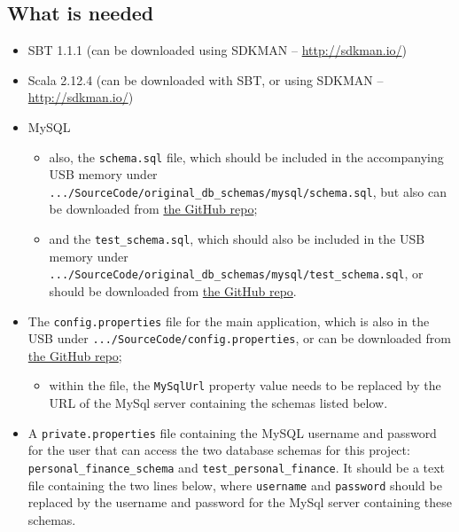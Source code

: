\subsection{What is needed}
\begin{itemize}
  \item
    SBT 1.1.1 (can be downloaded using SDKMAN -- \href{http://sdkman.io/}{http://sdkman.io/})

  \item
    Scala 2.12.4 (can be downloaded with SBT, or using SDKMAN -- 
    \href{http://sdkman.io/}{http://sdkman.io/})

  \item
    MySQL
    \begin{itemize}
      \item
        also, the \texttt{schema.sql} file, which should be included in the
        accompanying USB memory under
        \texttt{.../SourceCode/original\_db\_schemas/mysql/schema.sql}, but
        also can be downloaded from
        \href{https://github.com/claudiusbr/personal_finance_system/tree/master/code/original_db_schemas/mysql}{the
        GitHub repo};

      \item
        and the \texttt{test\_schema.sql}, which should also be included in the
        USB memory under
        \texttt{.../SourceCode/original\_db\_schemas/mysql/test\_schema.sql},
        or should be downloaded from
        \href{https://github.com/claudiusbr/personal_finance_system/tree/master/code/original_db_schemas/mysql}{the
        GitHub repo}.
    \end{itemize}

  \item
    The \texttt{config.properties} file for the main application, which is also
    in the USB under
    \texttt{.../SourceCode/config.properties}, or
    can be downloaded from
    \href{https://github.com/claudiusbr/personal_finance_system/tree/master/code}{the
    GitHub repo};
    \begin{itemize}
      \item
        within the file, the \texttt{MySqlUrl} property value needs to be
        replaced by the URL of the MySql server containing the schemas listed below.
    \end{itemize}


  \item 
    A \texttt{private.properties} file containing the MySQL username and password for
    the user that can access the two database schemas for this project:
    \texttt{personal\_finance\_schema} and \texttt{test\_personal\_finance}. It
    should be a text file containing the two lines below, where
    \texttt{username} and \texttt{password} should be replaced by the username
    and password for the MySql server containing these schemas.


\end{itemize}
